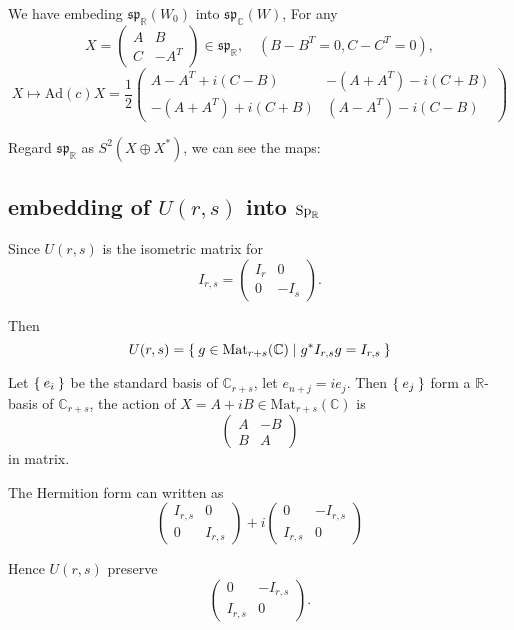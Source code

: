 \documentclass[12pt]{article}
\def\Mat{{\rm Mat}}
\def\bR{{\mathbb{R}}}
\def\bC{{\mathbb{C}}}
\def\sp{{\mathfrak{sp}}}
\def\Ad{{\rm Ad}}
\def\Sp{{\rm Sp}}
\def\Ad{\mathrm{Ad}}
\def\Mat{\mathrm{Mat}}
\begin{document}
We have embeding $\sp_\bR(W_0)$ into $\sp_\bC(W)$,
For any 
\[
X = \begin{pmatrix}
A & B \\
C & -A^T
\end{pmatrix}
\in \sp_\bR,
\quad (B-B^T=0,C-C^T=0),
\]
\[
X \mapsto
\Ad(c)X
= \frac{1}{2}\begin{pmatrix}
A-A^T + i(C-B) & -(A+A^T)-i(C+B) \\
-(A+A^T) +i(C+B) & (A-A^T)-i(C-B)
\end{pmatrix}
\]


Regard $\sp_\bR$ as $S^2(X\oplus X^*)$, we can see the maps:

\subsection{embedding of $U(r,s)$ into $\Sp_\bR$}
Since $U(r,s)$ is the isometric matrix for 
\[
I_{r,s} = \begin{pmatrix}
I_r & 0 \\
0 & -I_s 
\end{pmatrix}.
\]

Then 
\[
U(r,s) = \Set{g\in \Mat_{r+s}(\bC)| g^*I_{r,s}g = I_{r,s}}
\]

Let $\Set{e_i}$ be the standard basis of $\bC_{r+s}$, let $e_{n+j} = ie_j$.
Then $\Set{e_j}$ form a $\bR$-basis of $\bC_{r+s}$, the action of 
$X = A+iB\in \Mat_{r+s}(\bC)$ is  
\[
\begin{pmatrix}
A &-B\\
B & A
\end{pmatrix}
\]
in matrix.

The Hermition form can written as 
\[
\begin{pmatrix}
I_{r,s} & 0 \\
0 & I_{r,s}
\end{pmatrix}
+ i
\begin{pmatrix}
0 & -I_{r,s}\\
I_{r,s} & 0
\end{pmatrix}
\]

Hence $U(r,s)$ preserve 
\[
\begin{pmatrix}
0 & -I_{r,s}\\
I_{r,s} & 0
\end{pmatrix}.
\]
\end{document}
